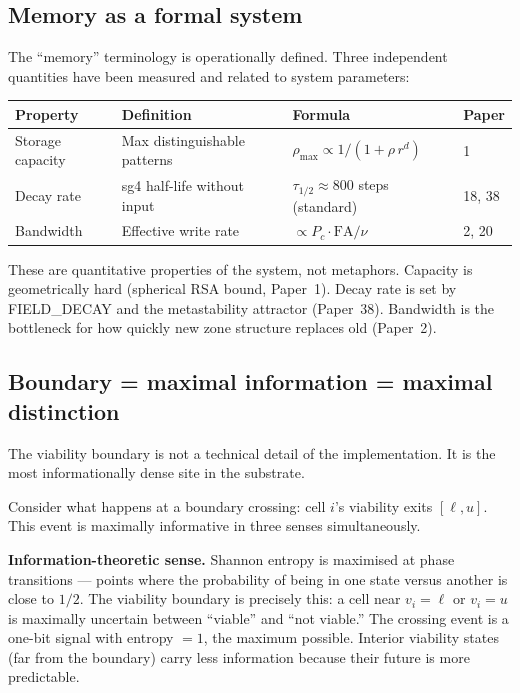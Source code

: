 \documentclass[11pt]{article}
\begin{document}
\subsection{Memory as a formal system}

The ``memory'' terminology is operationally defined.
Three independent quantities have been measured and related to system parameters:

\begin{center}
\begin{tabular}{llll}
\toprule
\textbf{Property} & \textbf{Definition} & \textbf{Formula} & \textbf{Paper} \\
\midrule
Storage capacity  & Max distinguishable patterns & $\rho_\mathrm{max} \propto 1/(1+\rho\,r^d)$ & 1 \\
Decay rate        & sg4 half-life without input  & $\tau_{1/2} \approx 800$ steps (standard) & 18, 38 \\
Bandwidth         & Effective write rate         & $\propto P_c \cdot \mathrm{FA} / \nu$ & 2, 20 \\
\bottomrule
\end{tabular}
\end{center}

These are quantitative properties of the system, not metaphors.
Capacity is geometrically hard (spherical RSA bound, Paper~1).
Decay rate is set by FIELD\_DECAY and the metastability attractor (Paper~38).
Bandwidth is the bottleneck for how quickly new zone structure replaces old (Paper~2).

\subsection{Boundary = maximal information = maximal distinction}

The viability boundary is not a technical detail of the implementation.
It is the most informationally dense site in the substrate.

Consider what happens at a boundary crossing: cell $i$'s viability exits $[\ell, u]$.
This event is maximally informative in three senses simultaneously.

\textbf{Information-theoretic sense.}
Shannon entropy is maximised at phase transitions --- points where the probability of
being in one state versus another is close to $1/2$.
The viability boundary is precisely this: a cell near $v_i = \ell$ or $v_i = u$
is maximally uncertain between ``viable'' and ``not viable.''
The crossing event is a one-bit signal with entropy $= 1$, the maximum possible.
Interior viability states (far from the boundary) carry less information
because their future is more predictable.
\end{document}
